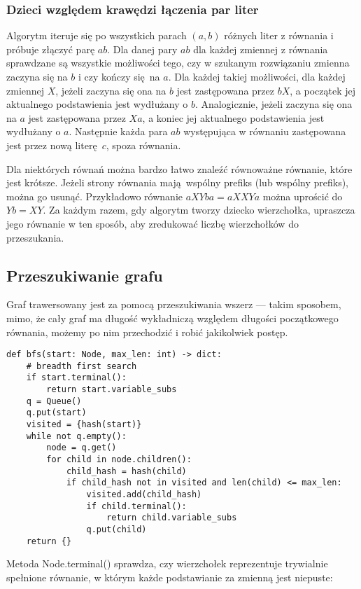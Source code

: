 \documentclass[leqno, 12pt]{article}
\begin{document}
\subsubsection*{Dzieci względem krawędzi łączenia par liter}
Algorytm iteruje się po wszystkich parach $(a, b)$ różnych liter z równania i próbuje złączyć parę $ab$.
Dla danej pary $ab$ dla każdej zmiennej z równania sprawdzane są wszystkie możliwości tego, czy w szukanym rozwiązaniu zmienna zaczyna się na $b$ i czy kończy się na $a$. Dla każdej takiej możliwości, dla każdej zmiennej $X$, jeżeli zaczyna się ona na $b$ jest zastępowana przez $bX$, a początek jej aktualnego podstawienia jest wydłużany o $b$. Analogicznie, jeżeli zaczyna się ona na $a$ jest zastępowana przez $Xa$, a koniec jej aktualnego podstawienia jest wydłużany o $a$. Następnie każda para $ab$ występująca w równaniu zastępowana jest przez nową literę $c$, spoza równania.

Dla niektórych równań można bardzo łatwo znaleźć równoważne równanie, które jest krótsze. Jeżeli strony równania mają wspólny prefiks (lub wspólny prefiks), można go usunąć. Przykładowo równanie $aXYba = aXXYa$ można uprościć do $Yb = XY$. Za każdym razem, gdy algorytm tworzy dziecko wierzchołka, upraszcza jego równanie w ten sposób, aby zredukować liczbę wierzchołków do przeszukania.

\subsection{Przeszukiwanie grafu}
Graf trawersowany jest za pomocą przeszukiwania wszerz --- takim sposobem, mimo, że cały graf ma długość wykładniczą względem długości początkowego równania, możemy po nim przechodzić i robić jakikolwiek postęp.

\begin{verbatim}
def bfs(start: Node, max_len: int) -> dict:
    # breadth first search
    if start.terminal():
        return start.variable_subs
    q = Queue()
    q.put(start)
    visited = {hash(start)}
    while not q.empty():
        node = q.get()
        for child in node.children():
            child_hash = hash(child)
            if child_hash not in visited and len(child) <= max_len:
                visited.add(child_hash)
                if child.terminal():
                    return child.variable_subs
                q.put(child)
    return {}
\end{verbatim}

Metoda Node.terminal() sprawdza, czy wierzchołek reprezentuje trywialnie spełnione równanie, w którym każde podstawianie za zmienną jest niepuste:
\end{document}
